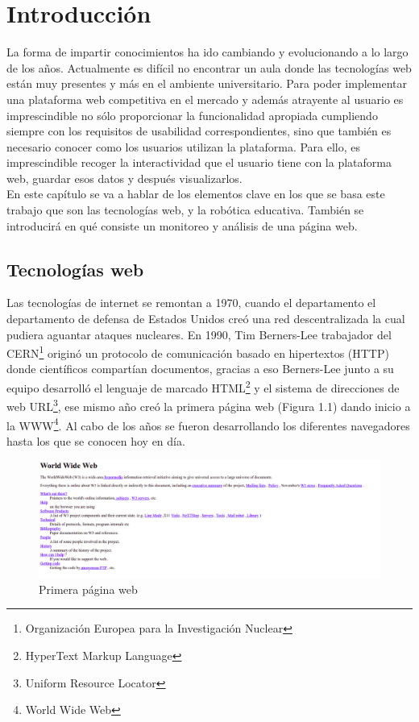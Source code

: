 \chapter{Introducción}
\label{chap:introduccion} 
La forma de impartir conocimientos ha ido cambiando y evolucionando a lo largo de los años. Actualmente es difícil no encontrar un aula donde las tecnologías web están muy presentes y más en el ambiente universitario. Para poder implementar una plataforma web competitiva en el mercado y además atrayente al usuario es imprescindible no sólo proporcionar la funcionalidad apropiada cumpliendo siempre con los requisitos de usabilidad correspondientes, sino que también es necesario conocer como los usuarios utilizan la plataforma. Para ello, es imprescindible recoger la interactividad que el usuario tiene con la plataforma web, guardar esos datos y después visualizarlos.\\

En este capítulo se va a hablar de los elementos clave en los que se basa este trabajo que son las tecnologías web, y la robótica educativa. También se introducirá en qué consiste un monitoreo y análisis de una página web.



\section{Tecnologías web}\label{motivacion}
Las tecnologías de internet se remontan a 1970, cuando el departamento el departamento de defensa de Estados Unidos creó una red descentralizada la cual pudiera aguantar ataques nucleares. En 1990, Tim Berners-Lee trabajador del CERN\footnote{Organización Europea para la Investigación Nuclear} originó un protocolo de comunicación basado en hipertextos (HTTP) donde científicos compartían documentos, gracias a eso Berners-Lee junto a su equipo desarrolló el lenguaje de marcado HTML\footnote{HyperText Markup Language} y el sistema de direcciones de web URL\footnote{Uniform Resource Locator}, ese mismo año creó la primera página web (Figura 1.1) dando inicio a la WWW\footnote{World Wide Web}. Al cabo de los años se fueron desarrollando los diferentes navegadores hasta los que se conocen hoy en día. \\

\begin{figure}[H]
    \centering
    \includegraphics[width=16cm, keepaspectratio]{img/first_web_page.png}
    \caption{Primera página web}
    \label{fig:web}
\end{figure}

